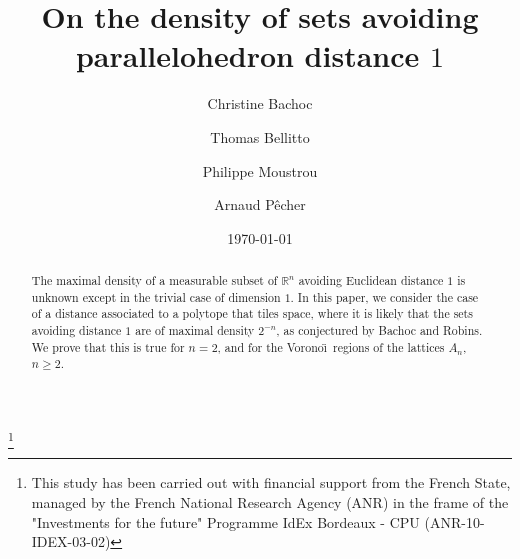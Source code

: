 \documentclass{amsart}                     %
\newcommand{\R}{{\mathbb R}}
\begin{document}
\title{On the density of sets avoiding parallelohedron distance $1$}

\thanks{This study has been carried out with financial support from the French State, managed by the French National Research Agency (ANR) in the frame of the "Investments for the future" Programme IdEx Bordeaux - CPU (ANR-10-IDEX-03-02)}



\author{Christine Bachoc \and Thomas Bellitto \and Philippe Moustrou \and Arnaud P\^echer
}


\address{Christine Bachoc, Institut de Math\'ematiques de Bordeaux, UMR 5251, Universit\'e de Bordeaux, 351 cours de la Lib\'eration, 33400 Talence, France.}

\address{Thomas Bellitto, LaBRI, Universit\'e de Bordeaux, 351 cours de la Lib\'eration, 33400 Talence, France.}

\address{Philippe Moustrou, Institut de Math\'ematiques de Bordeaux, UMR 5251, Universit\'e de Bordeaux, 351 cours de la Lib\'eration, 33400 Talence, France.}

\address{Arnaud P\^echer, LaBRI, Universit\'e de Bordeaux, 351 cours de la Lib\'eration, 33400 Talence, France.}


\date{\today}




\begin{abstract}
The maximal density of a measurable subset of $\R^n$
  avoiding Euclidean distance $1$ is unknown except in the trivial
  case of dimension $1$. In this paper, we consider the case of a
  distance associated to a polytope that tiles space, where it is
  likely that the  sets avoiding distance $1$ are of maximal density
  $2^{-n}$, as conjectured by Bachoc and Robins. We prove that this is true for $n=2$, and for the
  Vorono\"\i\  regions of the lattices $A_n$, $n\geq 2$.
\end{abstract}

\maketitle
\end{document}
